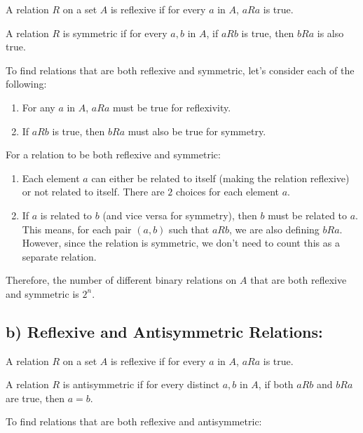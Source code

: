 \documentclass[12pt]{article}
\begin{document}
A relation \( R \) on a set \( A \) is reflexive if for every \( a \) in \( A \), \( aRa \) is true.

A relation \( R \) is symmetric if for every \( a, b \) in \( A \), if \( aRb \) is true, then \( bRa \) is also true.

To find relations that are both reflexive and symmetric, let's consider each of the following:

\begin{enumerate}
    \item For any \( a \) in \( A \), \( aRa \) must be true for reflexivity.
    \item If \( aRb \) is true, then \( bRa \) must also be true for symmetry.
\end{enumerate}

For a relation to be both reflexive and symmetric:

\begin{enumerate}
    \item Each element \( a \) can either be related to itself (making the relation reflexive) or not related to itself. There are \( 2 \) choices for each element \( a \).
    \item If \( a \) is related to \( b \) (and vice versa for symmetry), then \( b \) must be related to \( a \). This means, for each pair \( (a, b) \) such that \( aRb \), we are also defining \( bRa \). However, since the relation is symmetric, we don't need to count this as a separate relation.
\end{enumerate}

Therefore, the number of different binary relations on \( A \) that are both reflexive and symmetric is \( 2^n \).

\subsection*{b) Reflexive and Antisymmetric Relations:}

A relation \( R \) on a set \( A \) is reflexive if for every \( a \) in \( A \), \( aRa \) is true.

A relation \( R \) is antisymmetric if for every distinct \( a, b \) in \( A \), if both \( aRb \) and \( bRa \) are true, then \( a = b \).

To find relations that are both reflexive and antisymmetric:
\end{document}
